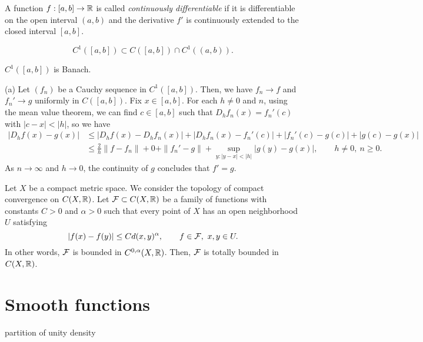 \documentclass{../../large}
\begin{document}
\begin{prb}
A function $f:[a,b]\to\mathbb{R}$ is called \emph{continuously differentiable} if it is differentiable on the open interval $(a,b)$ and the derivative $f'$ is continuously extended to the closed interval $[a,b]$.

\[C^1([a,b])\subset C([a,b])\cap C^1((a,b)).\]
\begin{parts}
\item $C^1([a,b])$ is Banach.
\end{parts}
\end{prb}
\begin{pf}
(a)
Let $(f_n)$ be a Cauchy sequence in $C^1([a,b])$.
Then, we have $f_n\to f$ and $f_n'\to g$ uniformly in $C([a,b])$.
Fix $x\in[a,b]$.
For each $h\ne0$ and $n$, using the mean value theorem, we can find $c\in[a,b]$ such that $D_hf_n(x)=f_n'(c)$ with $|c-x|<|h|$, so we have
\begin{align*}
|D_hf(x)-g(x)|
&\le|D_hf(x)-D_hf_n(x)|+|D_hf_n(x)-f_n'(c)|+|f_n'(c)-g(c)|+|g(c)-g(x)|\\
&\le\frac2h\|f-f_n\|+0+\|f_n'-g\|+\sup_{y:|y-x|<|h|}|g(y)-g(x)|,\qquad h\ne0,\ n\ge0.
\end{align*}
As $n\to\infty$ and $h\to0$, the continuity of $g$ concludes that $f'=g$.
\end{pf}


\begin{prb}
\end{prb}



\begin{prb}
Let $X$ be a compact metric space.
We consider the topology of compact convergence on $C(X,\mathbb{R})$.
Let $\mathcal{F}\subset C(X,\mathbb{R})$ be a family of functions with constants $C>0$ and $\alpha>0$ such that every point of $X$ has an open neighborhood $U$ satisfying
\[|f(x)-f(y)|\le Cd(x,y)^\alpha,\qquad f\in\mathcal{F},\ x,y\in U.\]
In other words, $\mathcal{F}$ is bounded in $C^{0,\alpha}(X,\mathbb{R})$.
Then, $\mathcal{F}$ is totally bounded in $C(X,\mathbb{R})$.
\end{prb}


\section{Smooth functions}

partition of unity
density


\begin{prb}
\end{prb}
\end{document}

